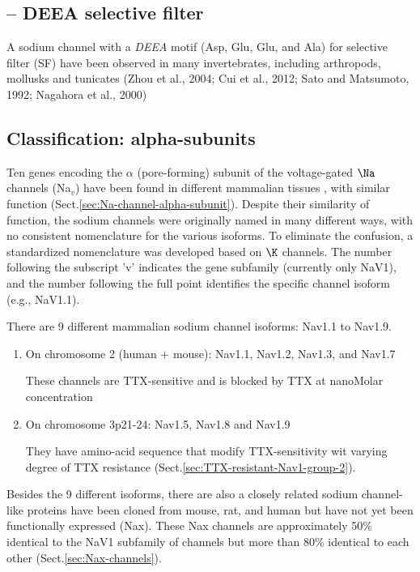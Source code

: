 \subsection{-- DEEA selective filter}
\label{sec:DEEA}


A sodium channel with a {\it DEEA} motif (Asp, Glu, Glu, and Ala)  for selective
filter (SF) have been observed in many invertebrates, including arthropods,
mollusks and tunicates (Zhou et al., 2004; Cui et al., 2012; Sato and Matsumoto,
1992; Nagahora et al., 2000)


\subsection{Classification: alpha-subunits}
\label{sec:Nav1-family-alpha-subunit-based-classification}

Ten genes encoding the $\alpha$ (pore-forming) subunit of the voltage-gated
$\Na$ channels (Na$_v$) have been found in different mammalian tissues
\citep{goldin2001}, with similar function
(Sect.\ref{sec:Na-channel-alpha-subunit}). Despite their similarity of function,
the sodium channels were originally named in many different ways, with no
consistent nomenclature for the various isoforms. To eliminate the confusion, a
standardized nomenclature was developed based on $\K$ channels. The number
following the subscript 'v' indicates the gene subfamily (currently only NaV1),
and the number following the full point identifies the specific channel isoform
(e.g., NaV1.1).

There are 9 different mammalian sodium channel isoforms: Nav1.1 to Nav1.9.
\begin{enumerate}
  \item On chromosome 2 (human + mouse): Nav1.1, Nav1.2, Nav1.3, and Nav1.7
  
  These channels are TTX-sensitive and is blocked by TTX at nanoMolar
  concentration
  
  \item On chromosome 3p21-24: Nav1.5, Nav1.8 and Nav1.9

  They have amino-acid sequence that modify TTX-sensitivity wit varying degree
  of TTX resistance (Sect.\ref{sec:TTX-resistant-Nav1-group-2}). 
  
\end{enumerate}

Besides the 9 different isoforms, there are also a closely related sodium
channel-like proteins have been cloned from mouse, rat, and human but have not
yet been functionally expressed (Nax).
These Nax channels are approximately 50\% identical to the NaV1 subfamily of
channels but more than 80\% identical to each other
(Sect.\ref{sec:Nax-channels}).


